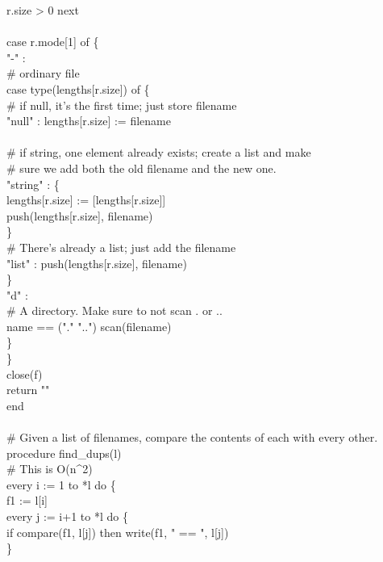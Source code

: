 {\>\>r.size {\textgreater} 0 {\textbar} next \\
\ \\
\>\>case r.mode[1] of \{ \\
\>\>\>"-" : \\
\>\>\>\>\# ordinary file \\
\>\>\>\>case type(lengths[r.size]) of \{ \\
\>\>\>\>\>\# if null, it's the first time; just store filename \\
\>\>\>\>\>"null" : lengths[r.size] := filename \\
\ \\
\>\>\>\>\>\# if string, one element already exists; create a list and make\\
\>\>\>\>\>\# sure we add both the old filename and the new one. \\
\>\>\>\>\>"string" : \{ \\
\>\>\>\>\>\>lengths[r.size] := [lengths[r.size]] \\
\>\>\>\>\>\>push(lengths[r.size], filename) \\
\>\>\>\>\>\>\} \\
\>\>\>\>\>\# There's already a list; just add the filename \\
\>\>\>\>\>"list" : push(lengths[r.size], filename) \\
\>\>\>\>\>\} \\
\>\>\>\>"d" : \\
\>\>\>\>\>\# A directory. Make sure to not scan . or .. \\
\>\>\>\>\>name == ("." {\textbar} "..") {\textbar} scan(filename) \\
\>\>\>\} \\
\>\>\} \\
\>close(f) \\
\>return "" \\
end \\
\ \\
\# Given a list of filenames, compare the contents of each with every other.\\
procedure find\_dups(l) \\
\>\# This is O(n\^{}2) \\
\>every i := 1 to *l do \{ \\
\>\>f1 := l[i] \\
\>\>every j := i+1 to *l do \{ \\
\>\>\>if compare(f1, l[j]) then write(f1, " == ", l[j]) \\
\>\>\>\} \\
}
